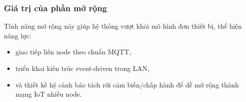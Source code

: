 \subsubsection*{Giá trị của phần mở rộng}

Tính năng mở rộng này giúp hệ thống vượt khỏi mô hình đơn thiết bị, thể hiện năng lực:
\begin{itemize}
    \item giao tiếp liên node theo chuẩn MQTT,
    \item triển khai kiến trúc event-driven trong LAN,
    \item và thiết kế hệ cảnh báo tách rời cảm biến/chấp hành để dễ mở rộng thành mạng IoT nhiều node.
\end{itemize}